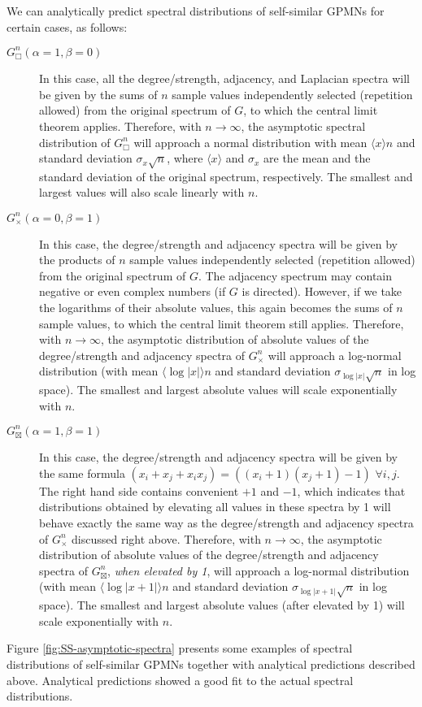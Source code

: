 \documentclass{article}
\DeclareMathOperator*{\CP}{\Box}
\DeclareMathOperator*{\DP}{\times}
\DeclareMathOperator*{\SP}{\boxtimes}
\begin{document}
We can analytically predict spectral distributions of self-similar
GPMNs for certain cases, as follows:
\begin{description}
\item[$G^n_{\CP} (\alpha = 1, \beta = 0)$] In this case, all the
  degree/strength, adjacency, and Laplacian spectra will be given by
  the sums of $n$ sample values independently selected (repetition
  allowed) from the original spectrum of $G$, to which the central
  limit theorem applies. Therefore, with $n \to \infty$, the
  asymptotic spectral distribution of $G^n_{\CP}$ will approach a
  normal distribution with mean $\langle x \rangle n$ and
  standard deviation $\sigma_x \sqrt{n}$, where $\langle x \rangle$ and $\sigma_x$
  are the mean and the standard deviation of the original spectrum,
  respectively. The smallest and largest values will also scale
  linearly with $n$.
\item[$G^n_{\DP} (\alpha = 0, \beta = 1)$] In this case, the
  degree/strength and adjacency spectra will be given by the products
  of $n$ sample values independently selected (repetition allowed)
  from the original spectrum of $G$. The adjacency spectrum may
  contain negative or even complex numbers (if $G$ is
  directed). However, if we take the logarithms of their absolute
  values, this again becomes the sums of $n$ sample values, to which
  the central limit theorem still applies. Therefore, with $n \to
  \infty$, the asymptotic distribution of absolute values of the
  degree/strength and adjacency spectra of $G^n_{\DP}$ will approach a
  log-normal distribution (with mean $\langle \log |x| \rangle n$ and
  standard deviation $\sigma_{\log |x|} \sqrt{n}$ in log space). The smallest and
  largest absolute values will scale exponentially with $n$.
\item[$G^n_{\SP} (\alpha = 1, \beta = 1)$] In this case, the
  degree/strength and adjacency spectra will be given by the same
  formula $\left( x_i + x_j + x_i x_j \right) = \left( (x_i + 1) (x_j
  + 1) - 1 \right)$ $\forall i, j$. The right hand side contains
  convenient $+1$ and $-1$, which indicates that distributions
  obtained by elevating all values in these spectra by 1 will behave
  exactly the same way as the degree/strength and adjacency spectra of
  $G^n_{\DP}$ discussed right above. Therefore, with $n \to \infty$,
  the asymptotic distribution of absolute values of the
  degree/strength and adjacency spectra of $G^n_{\SP}$, {\em when
    elevated by 1}, will approach a log-normal distribution (with mean
  $\langle \log |x+1| \rangle n$ and standard deviation $\sigma_{\log |x+1|}
  \sqrt{n}$ in log space). The smallest and largest absolute values
  (after elevated by 1) will scale exponentially with $n$.
\end{description}
Figure \ref{fig:SS-asymptotic-spectra} presents some examples of
spectral distributions of self-similar GPMNs together with analytical
predictions described above. Analytical predictions showed a good fit
to the actual spectral distributions.
\end{document}
